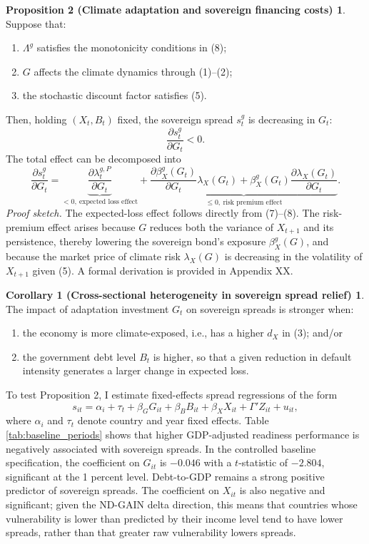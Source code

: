 \documentclass[11pt]{article}
\theoremstyle{definition}
\newtheorem*{propTwo}{Proposition 2 (Climate adaptation and sovereign financing costs)}
\newtheorem*{corOne}{Corollary 1 (Cross-sectional heterogeneity in sovereign spread relief)}
\begin{document}
\begin{propTwo}
Suppose that:
\begin{enumerate}
    \item $\Lambda^g$ satisfies the monotonicity conditions in (8);
    \item $G$ affects the climate dynamics through (1)--(2);
    \item the stochastic discount factor satisfies (5).
\end{enumerate}
Then, holding $(X_t,B_t)$ fixed, the sovereign spread $s^g_t$ is decreasing in $G_t$:
\begin{equation}
\frac{\partial s^g_t}{\partial G_t}<0.
\end{equation}
The total effect can be decomposed into
\begin{equation}
\frac{\partial s^g_t}{\partial G_t}
=
\underbrace{\frac{\partial \lambda^{g,P}_t}{\partial G_t}}_{<0,\ \text{expected loss effect}}
+
\underbrace{\frac{\partial \beta^g_X(G_t)}{\partial G_t}\lambda_X(G_t)
+\beta^g_X(G_t)\frac{\partial \lambda_X(G_t)}{\partial G_t}}_{\leq 0,\ \text{risk premium effect}}.
\end{equation}
\textit{Proof sketch.} The expected-loss effect follows directly from (7)--(8). The risk-premium effect arises because $G$ reduces both the variance of $X_{t+1}$ and its persistence, thereby lowering the sovereign bond's exposure $\beta^g_X(G)$, and because the market price of climate risk $\lambda_X(G)$ is decreasing in the volatility of $X_{t+1}$ given (5). A formal derivation is provided in Appendix XX.
\end{propTwo}

\begin{corOne}
The impact of adaptation investment $G_t$ on sovereign spreads is stronger when:
\begin{enumerate}
    \item the economy is more climate-exposed, i.e., has a higher $d_X$ in (3); and/or
    \item the government debt level $B_t$ is higher, so that a given reduction in default intensity generates a larger change in expected loss.
\end{enumerate}
\end{corOne}

To test Proposition 2, I estimate fixed-effects spread regressions of the form
\begin{equation}
    s_{it}=\alpha_i+\tau_t+\beta_G G_{it}+\beta_B B_{it}+\beta_X X_{it}+\Gamma'Z_{it}+u_{it},
\end{equation}
where $\alpha_i$ and $\tau_t$ denote country and year fixed effects. Table \ref{tab:baseline_periods} shows that higher GDP-adjusted readiness performance is negatively associated with sovereign spreads. In the controlled baseline specification, the coefficient on $G_{it}$ is $-0.046$ with a $t$-statistic of $-2.804$, significant at the 1 percent level. Debt-to-GDP remains a strong positive predictor of sovereign spreads. The coefficient on $X_{it}$ is also negative and significant; given the ND-GAIN delta direction, this means that countries whose vulnerability is lower than predicted by their income level tend to have lower spreads, rather than that greater raw vulnerability lowers spreads.
\end{document}
